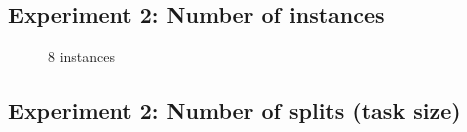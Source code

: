 \documentclass[11pt,a4paper]{article}
\begin{document}
\subsection{Experiment 2: Number of instances}

\begin{figure}[p]
    \centering
    
    \caption{8 instances}
    \label{fig:histo_instance}
\end{figure}

\subsection{Experiment 2: Number of splits (task size)}
\end{document}
